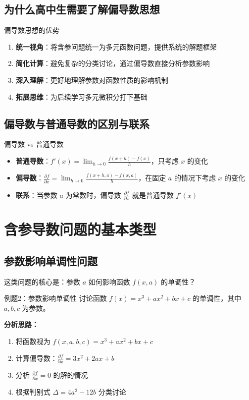 \documentclass[a4paper,11pt]{ctexart}
\newcommand{\partialder}[2]{\frac{\partial #1}{\partial #2}}
\theoremstyle{definition}
\theoremstyle{remark}
\begin{document}
\subsection{为什么高中生需要了解偏导数思想}

\begin{methodbox}{偏导数思想的优势}
\begin{enumerate}
    \item \textbf{统一视角}：将含参问题统一为多元函数问题，提供系统的解题框架
    \item \textbf{简化计算}：避免复杂的分类讨论，通过偏导数直接分析参数影响
    \item \textbf{深入理解}：更好地理解参数对函数性质的影响机制
    \item \textbf{拓展思维}：为后续学习多元微积分打下基础
\end{enumerate}
\end{methodbox}

\subsection{偏导数与普通导数的区别与联系}

\begin{conceptbox}{偏导数 vs 普通导数}
\begin{itemize}
    \item \textbf{普通导数}：$f'(x) = \lim_{h \to 0} \frac{f(x+h) - f(x)}{h}$，只考虑 $x$ 的变化
    \item \textbf{偏导数}：$\partialder{f}{x} = \lim_{h \to 0} \frac{f(x+h,a) - f(x,a)}{h}$，在固定 $a$ 的情况下考虑 $x$ 的变化
    \item \textbf{联系}：当参数 $a$ 为常数时，偏导数 $\partialder{f}{x}$ 就是普通导数 $f'(x)$
\end{itemize}
\end{conceptbox}

\section{含参导数问题的基本类型}

\subsection{参数影响单调性问题}

这类问题的核心是：参数 $a$ 如何影响函数 $f(x,a)$ 的单调性？

\begin{examplebox}{例题2：参数影响单调性}
讨论函数 $f(x) = x^3 + ax^2 + bx + c$ 的单调性，其中 $a, b, c$ 为参数。

\textbf{分析思路：}
\begin{enumerate}
    \item 将函数视为 $f(x,a,b,c) = x^3 + ax^2 + bx + c$
    \item 计算偏导数：$\partialder{f}{x} = 3x^2 + 2ax + b$
    \item 分析 $\partialder{f}{x} = 0$ 的解的情况
    \item 根据判别式 $\Delta = 4a^2 - 12b$ 分类讨论
\end{enumerate}
\end{examplebox}
\end{document}
